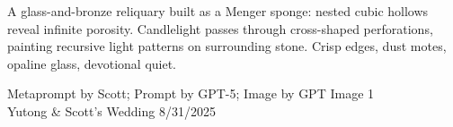 \documentclass[12pt]{article}
\begin{document}
\noindent
\begin{adjustbox}{max size={\textwidth}{\textheight}}
\begin{varwidth}{\textwidth}
\RaggedRight
\footnotesize
A glass-and-bronze reliquary built as a Menger sponge: nested cubic hollows reveal infinite porosity. Candlelight passes through cross-shaped perforations, painting recursive light patterns on surrounding stone. Crisp edges, dust motes, opaline glass, devotional quiet.
\end{varwidth}
\end{adjustbox}
\vfill
{\raggedleft\footnotesize
Metaprompt by Scott; Prompt by GPT-5; Image by GPT Image 1 \\
Yutong \& Scott's Wedding 8/31/2025\par}
\end{document}
